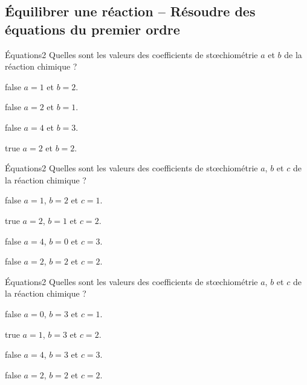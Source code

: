 \documentclass[11pt]{article}
\begin{document}
    \subsection{Équilibrer une réaction -- Résoudre des équations du premier ordre}
		\begin{question}{8}{Équations}{2}{}
            Quelles sont les valeurs des coefficients de st\oe{}chiométrie $a$ et $b$ de la réaction chimique ?
        \end{question}
        \begin{reponses}
            \item[false] $a=1$ et $b=2$.
            \item[false] $a=2$ et $b=1$.
            \item[false] $a=4$ et $b=3$.
            \item[true] $a=2$ et $b=2$.
        \end{reponses}
        
        \begin{question}{8}{Équations}{2}{}
            Quelles sont les valeurs des coefficients de st\oe{}chiométrie $a$, $b$ et $c$ de la réaction chimique ?
        \end{question}
        \begin{reponses}
            \item[false] $a=1$, $b=2$ et $c=1$.
            \item[true] $a=2$, $b=1$ et $c=2$.
            \item[false] $a=4$, $b=0$ et $c=3$.
            \item[false] $a=2$, $b=2$ et $c=2$.
        \end{reponses}
		
		\begin{question}{8}{Équations}{2}{}
			Quelles sont les valeurs des coefficients de st\oe{}chiométrie $a$, $b$ et $c$ de la réaction chimique ?
		\end{question}
		\begin{reponses}
			\item[false] $a=0$, $b=3$ et $c=1$.
			\item[true] $a=1$, $b=3$ et $c=2$.
			\item[false] $a=4$, $b=3$ et $c=3$.
			\item[false] $a=2$, $b=2$ et $c=2$.
		\end{reponses}
		
\end{document}

